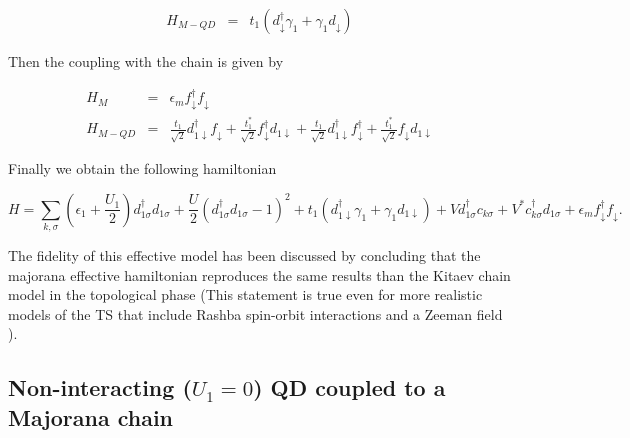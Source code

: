 \begin{eqnarray}
H_{M-QD} & = &  t_1 \left(d_{\downarrow}^{\dagger}\gamma_{1}+\gamma_{1}d_{\downarrow}\right) 
\label{eq:MajoranaCoupling}
\end{eqnarray}





Then the coupling with the chain is given by 

\begin{eqnarray*}
H_{M} & = & \epsilon_{m}f_{\downarrow}^{\dagger}f_{\downarrow}\\
H_{M-QD}&=&\frac{t_1}{\sqrt{2}}d_{1\downarrow}^{\dagger}f_{\downarrow}+\frac{t_1^{*}}{\sqrt{2}}f_{\downarrow}^{\dagger}d_{1\downarrow}+\frac{t_1}{\sqrt{2}}d_{1\downarrow}^{\dagger}f_{\downarrow}^{\dagger}+\frac{t_1^{*}}{\sqrt{2}}f_{\downarrow}d_{1\downarrow}
\end{eqnarray*}

Finally we obtain the following hamiltonian

\begin{equation}
H =\sum_{k,\sigma}\left(\epsilon_1+\frac{U_1}{2}\right)d_{1\sigma}^{\dagger}d_{1\sigma}+ \frac{U}{2}(d_{1\sigma}^{\dagger}d_{1\sigma}-1)^{2} + t_1 \left(d_{1\downarrow}^{\dagger}\gamma_{1}+\gamma_{1}d_{1\downarrow}\right) + Vd^\dagger_{1\sigma}c_{k\sigma}+V^* c^\dagger_{k\sigma}d_{1\sigma}+ \epsilon_{m}f_{\downarrow}^{\dagger}f_{\downarrow}.
\label{eq:QD-Mham}
\end{equation}


The fidelity of this effective model has been discussed by \citet{ruiz-tijerina_interaction_2015}
concluding that the majorana effective hamiltonian reproduces the
same results than the Kitaev chain model in the topological phase
(This statement is true even for more realistic models of the TS that
include Rashba spin-orbit interactions and a Zeeman field \citep{ruiz-tijerina_interaction_2015}
).\\


\subsection{Non-interacting ($U_1 = 0$) QD coupled to a Majorana chain}

